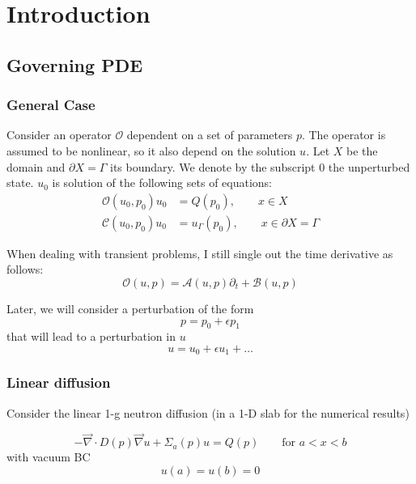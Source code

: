 \documentclass[11pt]{article}
\renewcommand{\div}{\vec{\nabla}\! \cdot \!}
\newcommand{\grad}{\vec{\nabla}}
\newcommand{\be}{\begin{equation}}
\newcommand{\ee}{\end{equation}}
\renewcommand{\O}{\mathcal{O}}
\newcommand{\mc}[1]{\mathcal{#1}}
\begin{document}
\section{Introduction}

\subsection{Governing PDE}

\subsubsection{General Case}

Consider an operator $\O$ dependent on a set of parameters $p$. The operator is assumed
to be nonlinear, so it also depend on the solution $u$. Let $X$ be the domain and $\partial X=\Gamma$
its boundary. We denote by the subscript $0$ the unperturbed state. $u_0$ is solution of the following
sets of equations:
\begin{align}
\O(u_0,p_0) u_0 &= Q(p_0), \qquad x\in X \label{eq:gov} \\
\mc{C}(u_0,p_0) u_0 &=u_\Gamma(p_0), \qquad x \in \partial X=\Gamma \label{eq:BCgov}
\end{align}

When dealing with transient problems, I still single out the time derivative as follows:
\be
\O(u,p) = \mc{A}(u,p)\partial_t + \mc{B}(u,p)
\ee

Later, we will consider a perturbation of the form
\be
p = p_0 + \epsilon p_1
\ee
that will lead to a perturbation in $u$
\be
u=u_0 + \epsilon u_1 + \ldots
\ee

\subsubsection{Linear diffusion}

Consider the linear 1-g neutron diffusion (in a 1-D slab for the numerical results)

\be
-\div D(p) \grad u  + \Sigma_a(p) u = Q(p) \qquad \text{for } a<x<b
\ee
with vacuum BC
\be
u(a)=u(b)=0
\ee
\end{document}
